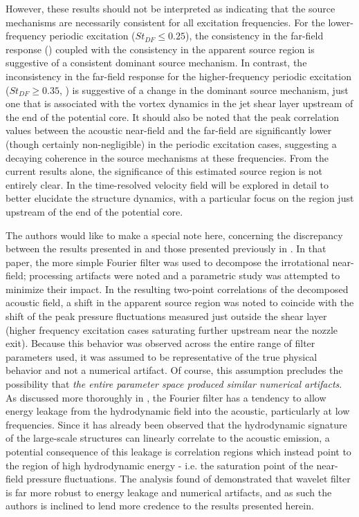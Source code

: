 However, these results should not be interpreted as indicating that the source mechanisms are necessarily consistent for all excitation frequencies. 
For the lower-frequency periodic excitation ($St_{DF} \leq 0.25$), the consistency in the far-field response () coupled with the consistency in the apparent source region is suggestive of a consistent dominant source mechanism.
In contrast, the inconsistency in the far-field response for the higher-frequency periodic excitation ($St_{DF} \geq 0.35$, ) is suggestive of a change in the dominant source mechanism, just one that is associated with the vortex dynamics in the jet shear layer upstream of the end of the potential core.
It should also be noted that the peak correlation values between the acoustic near-field and the far-field are significantly lower (though certainly non-negligible) in the periodic excitation cases, suggesting a decaying coherence in the source mechanisms at these frequencies.
From the current results alone, the significance of this estimated source region is not entirely clear.
In  the time-resolved velocity field will be explored in detail to better elucidate the structure dynamics, with a particular focus on the region just upstream of the end of the potential core.

The authors would like to make a special note here, concerning the discrepancy between the results presented in  and those presented previously in \citet{Crawley2015}.
In that paper, the more simple Fourier filter was used to decompose the irrotational near-field; processing artifacts were noted and a parametric study was attempted to minimize their impact.
In the resulting two-point correlations of the decomposed acoustic field, a shift in the apparent source region was noted to coincide with the shift of the peak pressure fluctuations measured just outside the shear layer (higher frequency excitation cases saturating further upstream near the nozzle exit).
Because this behavior was observed across the entire range of filter parameters used, it was assumed to be representative of the true physical behavior and not a numerical artifact.
Of course, this assumption precludes the possibility that \textit{the entire parameter space produced similar numerical artifacts}. 
As discussed more thoroughly in \citet{Crawley2016}, the Fourier filter has a tendency to allow energy leakage from the hydrodynamic field into the acoustic, particularly at low frequencies. 
Since it has already been observed that the hydrodynamic signature of the large-scale structures can linearly correlate to the acoustic emission, a potential consequence of this leakage is correlation regions which instead point to the region of high hydrodynamic energy - i.e. the saturation point of the near-field pressure fluctuations.
The analysis found of \citet{Crawley2016} demonstrated that wavelet filter is far more robust to energy leakage and numerical artifacts, and as such the authors is inclined to lend more credence to the results presented herein. 